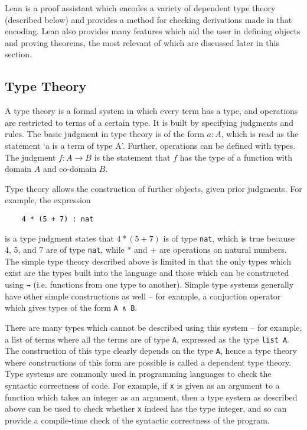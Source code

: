 \documentclass[runningheads,a4paper]{llncs}
\renewcommand{\-}{\setminus}
\begin{document}
Lean is a proof assistant which encodes a variety of dependent type theory (described below) and provides a method for checking derivations made in that encoding. Lean also provides many features which aid the user in defining objects and proving theorems, the most relevant of which are discussed later in this section.

\subsection{Type Theory}

A type theory is a formal system in which every term has a type, and operations are restricted to terms of a certain type. It is built by specifying judgments and rules. The basic judgment in type theory is of the form $a : A$, which is read as the statement `a is a term of type A'. Further, operations can be defined with types. The judgment $f : A \to B$ is the statement that $f$ has the type of a function with domain $A$ and co-domain $B$.

Type theory allows the construction of further objects, given prior judgments. For example, the expression

\begin{lstlisting}
    4 * (5 + 7) : nat
\end{lstlisting}

is a type judgment states that $4 * (5 + 7)$ is of type \lstinline{nat}, which is true because 4, 5, and 7 are of type \lstinline{nat}, while $*$ and $+$ are operations on natural numbers.\\

The simple type theory described above is limited in that the only types which exist are the types built into the language and those which can be constructed using \lstinline{→} (i.e. functions from one type to another). Simple type systems generally have other simple constructions as well -- for example, a conjuction operator which gives types of the form \lstinline{A ∧ B}.

There are many types which cannot be described using this system -- for example, a list of terms where all the terms are of type \lstinline{A}, expressed as the type \lstinline{list A}. The construction of this type clearly depends on the type \lstinline{A}, hence a type theory where constructions of this form are possible is called a dependent type theory.\\

Type systems are commonly used in programming languages to check the syntactic correctness of code. For example, if \lstinline{x} is given as an argument to a function which takes an integer as an argument, then a type system as described above can be used to check whether \lstinline{x} indeed has the type integer, and so can provide a compile-time check of the syntactic correctness of the program.
\end{document}
